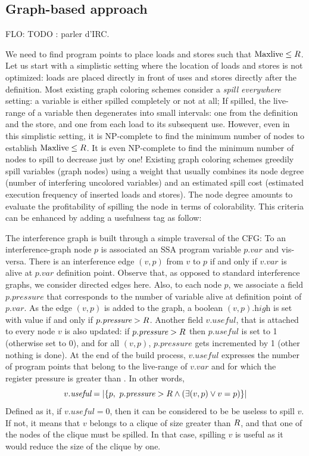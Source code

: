 {\subsection{Graph-based approach}

FLO: TODO : parler d'IRC.

We need to find program points to place loads and stores such that $\mathrm{Maxlive}\le R$.
Let us start with a simplistic setting where the location of loads and stores is not optimized:
loads are placed directly in front of uses and stores directly after the definition.
Most existing graph coloring schemes consider a \emph{spill everywhere} setting:
a variable is either spilled completely or not at all;
If spilled, the live-range of a variable then degenerates into small intervals: one from the definition and the store, and one from each load to its subsequent use.
However, even in this simplistic setting, it is NP-complete to find the minimum number of nodes to establish $\mathrm{Maxlive}\le R$.
It is even NP-complete to find the minimum number of nodes to spill to decrease \maxlive just by one!
Existing graph coloring schemes greedily spill variables (graph nodes) using a weight that usually combines its node degree (number of interfering uncolored variables) and an estimated spill cost (estimated execution frequency of inserted loads and stores).
The node degree amounts to evaluate the profitability of spilling the node in terms of colorability.
This criteria can be enhanced by adding a usefulness tag as follow:

The interference graph is built through a simple traversal of the CFG: 
To an interference-graph node $p$ is associated an SSA program variable $p.\textit{var}$ and vis-versa. 
There is an interference edge $(v,p)$ from $v$ to $p$ if and only if $v.\textit{var}$ is alive at $p.\textit{var}$ definition point. 
Observe that, as opposed to standard interference graphs, we consider directed edges here. 
Also, to each node $p$, we associate a field $p.\textit{pressure}$ that corresponds to the number of variable alive at definition point of $p.\textit{var}$. 
As the edge $(v,p)$ is added to the graph, a boolean $(v,p).\textit{high}$ is set with value \true if and only if $p.\textit{pressure}>R$. 
Another field $v.\textit{useful}$, that is attached to every node $v$ is also updated: 
if $p.\textit{pressure}>R$ then $p.\textit{useful}$ is set to 1 (otherwise set to 0), and for all $(v,p)$, $p.\textit{pressure}$ gets incremented by 1 (other nothing is done). 
At the end of the build process, $v.\textit{useful}$ expresses the number of program points that belong to the live-range of $v.\textit{var}$ and for which the register pressure is greater than \regs. 
In other words,
$$v.\textit{useful}=\left|\lbrace p,\ p.\textit{pressure}>\regs \wedge\left(\exists (v,p) \vee v=p \right) \rbrace\right|$$
Defined as it, if $v.\textit{useful}=0$, then it can be considered to be be useless to spill $v$.
If not, it means that $v$ belongs to a clique of size greater than $R$, and that one of the nodes of the clique must be spilled. 
In that case, spilling $v$ is useful as it would reduce the size of the clique by one.

}
